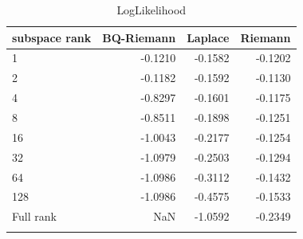 \begin{table}[H]
\caption{LogLikelihood}
\begin{tabular}{lrrr}
\toprule
subspace rank & BQ-Riemann & Laplace & Riemann \\
\midrule
1 & -0.1210 & -0.1582 & -0.1202 \\
2 & -0.1182 & -0.1592 & -0.1130 \\
4 & -0.8297 & -0.1601 & -0.1175 \\
8 & -0.8511 & -0.1898 & -0.1251 \\
16 & -1.0043 & -0.2177 & -0.1254 \\
32 & -1.0979 & -0.2503 & -0.1294 \\
64 & -1.0986 & -0.3112 & -0.1432 \\
128 & -1.0986 & -0.4575 & -0.1533 \\
Full rank & NaN & -1.0592 & -0.2349 \\
\label{UCI_wine_table1}
\bottomrule
\end{tabular}
\end{table}
